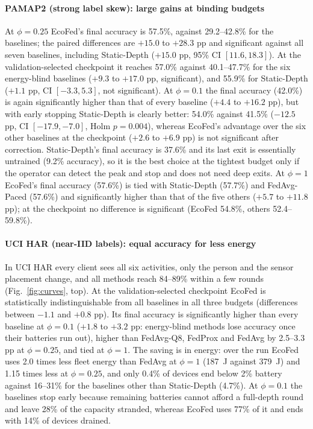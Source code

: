 \paragraph{PAMAP2 (strong label skew): large gains at binding budgets}
At $\phi=0.25$ EcoFed's final accuracy is 57.5\%, against 29.2--42.8\% for the baselines; the paired differences are $+15.0$ to $+28.3$ pp and significant against all seven baselines, including Static-Depth ($+15.0$ pp, 95\% CI $[11.6,18.3]$). At the validation-selected checkpoint it reaches 57.0\% against 40.1--47.7\% for the six energy-blind baselines ($+9.3$ to $+17.0$ pp, significant), and 55.9\% for Static-Depth ($+1.1$ pp, CI $[-3.3,5.3]$, not significant). At $\phi=0.1$ the final accuracy (42.0\%) is again significantly higher than that of every baseline ($+4.4$ to $+16.2$ pp), but with early stopping Static-Depth is clearly better: 54.0\% against 41.5\% ($-12.5$ pp, CI $[-17.9,-7.0]$, Holm $p=0.004$), whereas EcoFed's advantage over the six other baselines at the checkpoint ($+2.6$ to $+6.9$ pp) is not significant after correction. Static-Depth's final accuracy is 37.6\% and its last exit is essentially untrained (9.2\% accuracy), so it is the best choice at the tightest budget only if the operator can detect the peak and stop and does not need deep exits. At $\phi=1$ EcoFed's final accuracy (57.6\%) is tied with Static-Depth (57.7\%) and FedAvg-Paced (57.6\%) and significantly higher than that of the five others ($+5.7$ to $+11.8$ pp); at the checkpoint no difference is significant (EcoFed 54.8\%, others 52.4--59.8\%).

\paragraph{UCI HAR (near-IID labels): equal accuracy for less energy}
In UCI HAR every client sees all six activities, only the person and the sensor placement change, and all methods reach 84--89\% within a few rounds (Fig.~\ref{fig:curves}, top). At the validation-selected checkpoint EcoFed is statistically indistinguishable from all baselines in all three budgets (differences between $-1.1$ and $+0.8$ pp). Its final accuracy is significantly higher than every baseline at $\phi=0.1$ ($+1.8$ to $+3.2$ pp: energy-blind methods lose accuracy once their batteries run out), higher than FedAvg-Q8, FedProx and FedAvg by 2.5--3.3 pp at $\phi=0.25$, and tied at $\phi=1$. The saving is in energy: over the run EcoFed uses 2.0 times less fleet energy than FedAvg at $\phi=1$ (187~J against 379~J) and 1.15 times less at $\phi=0.25$, and only 0.4\% of devices end below 2\% battery against 16--31\% for the baselines other than Static-Depth (4.7\%). At $\phi=0.1$ the baselines stop early because remaining batteries cannot afford a full-depth round and leave 28\% of the capacity stranded, whereas EcoFed uses 77\% of it and ends with 14\% of devices drained.

